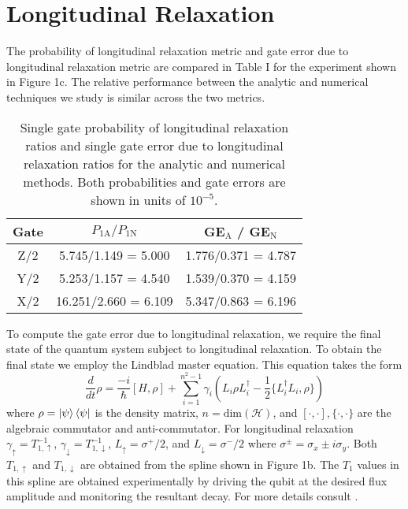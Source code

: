 \section{Longitudinal Relaxation}
The probability of longitudinal relaxation metric and gate error due to longitudinal
relaxation metric are compared in Table I for the experiment shown in Figure 1c.
The relative performance between the analytic and numerical techniques we study
is similar across the two metrics.

\begin{table}[h!]
  \begin{tabular}{c | c | c}
    Gate & $P_{1\textrm{A}} / P_{1\textrm{N}}$ & GE$_{\textrm{A}}$ / GE$_{\textrm{N}}$\\
    \hline
    Z/2 & 5.745/1.149 = 5.000 & 1.776/0.371 = 4.787\\
    Y/2 & 5.253/1.157 = 4.540 & 1.539/0.370 = 4.159\\
    X/2 & 16.251/2.660 = 6.109 & 5.347/0.863 = 6.196\\
  \end{tabular}
  \caption{
    Single gate probability of longitudinal relaxation
    ratios and single gate error due to longitudinal relaxation
    ratios for the analytic and numerical methods. Both probabilities
    and gate errors are shown in units of $10^{-5}$.
  }
\end{table}

To compute the gate error due to longitudinal relaxation,
we require the final state of the quantum system subject
to longitudinal relaxation. To obtain the final state we employ
the Lindblad master equation. This equation takes the form
\begin{equation}
  \frac{d}{dt} \rho = \frac{-i}{\hbar} [H, \rho]
  + \sum_{i = 1}^{n^{2} - 1} \gamma_{i} (L_{i} \rho L_{i}^{\dagger}
  - \frac{1}{2} \{L_{i}^{\dagger} L_{i}, \rho\})
\end{equation}
where $\rho = \ket{\psi}\bra{\psi}$ is the density matrix, $n = \textrm{dim}(\mathcal{H})$,
and $[\cdot, \cdot], \{\cdot, \cdot \}$ are the algebraic commutator and anti-commutator.
For longitudinal relaxation $\gamma_{\uparrow} = T_{1, \uparrow}^{-1}$,
$\gamma_{\downarrow} = T_{1, \downarrow}^{-1}$,
$L_{\uparrow} = \sigma^{+}/2$, and
$L_{\downarrow} = \sigma^{-}/2$ where $\sigma^{\pm} = \sigma_{x} \pm i \sigma_{y}$.
Both $T_{1, \uparrow}$ and $T_{1, \downarrow}$ are obtained from the spline shown in Figure 1b.
The $T_{1}$ values in this spline are obtained experimentally by driving the qubit at the desired flux amplitude
and monitoring the resultant decay. For more details consult \cite{zhang2020universal}.

